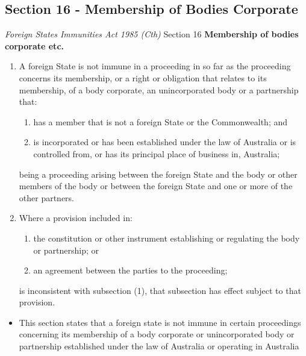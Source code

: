 \subsection{Section 16 - Membership of Bodies Corporate}
\begin{statutedetails}{\textit{Foreign States Immunities Act 1985 (Cth)} Section 16}
    \flushleft
    \textbf{Membership of bodies corporate etc.}
    \begin{enumerate}
        \item A foreign State is not immune in a proceeding in so far as the proceeding concerns its membership, or a right or obligation that relates to its membership, of a body corporate, an unincorporated body or a partnership that:
        \begin{enumerate}
            \item has a member that is not a foreign State or the Commonwealth; and
            \item is incorporated or has been established under the law of Australia or is controlled from, or has its principal place of business in, Australia;
        \end{enumerate}
        being a proceeding arising between the foreign State and the body or other members of the body or between the foreign State and one or more of the other partners.
        \item Where a provision included in:
        \begin{enumerate}
            \item the constitution or other instrument establishing or regulating the body or partnership; or
            \item an agreement between the parties to the proceeding;
        \end{enumerate}
        is inconsistent with subsection (1), that subsection has effect subject to that provision.
    \end{enumerate}
\end{statutedetails}

\begin{itemize}
    \item This section states that a foreign state is not immune in certain proceedings concerning its membership of a body corporate or unincorporated body or partnership established under the law of Australia or operating in Australia
\end{itemize}

